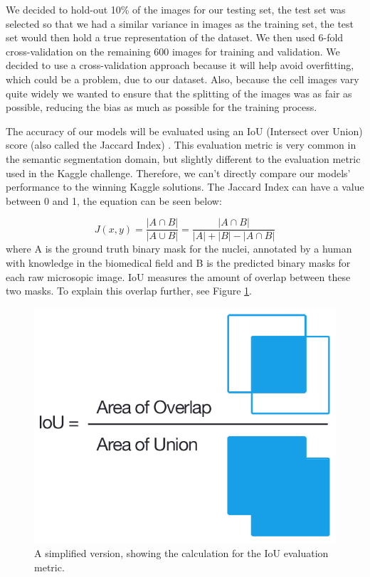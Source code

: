 \documentclass{article}
\begin{document}
We decided to hold-out 10\% of the images for our testing set, the test set was selected so that we had a similar variance in images as the training set, the test set would then hold a true representation of the dataset. We then used 6-fold cross-validation on the remaining 600 images for training and validation. We decided to use a cross-validation approach because it will help avoid overfitting, which could be a problem, due to our dataset. Also, because the cell images vary quite widely we wanted to ensure that the splitting of the images was as fair as possible, reducing the bias as much as possible for the training process.

The accuracy of our models will be evaluated using an IoU (Intersect over Union) score (also called the Jaccard Index) \cite{Tan2005IntroductionTD}. This evaluation metric is very common in the semantic segmentation domain, but slightly different to the evaluation metric used in the Kaggle challenge. Therefore, we can't directly compare our models' performance to the winning Kaggle solutions. The Jaccard Index can have a value between 0 and 1, the equation can be seen below:


\[ J(x,y) = \dfrac{|A \cap B|}{|A \cup B|} = \dfrac{|A \cap B|}{|A|+|B|-|A \cap B|}\]
where A is the ground truth binary mask for the nuclei, annotated by a human with knowledge in the biomedical field and B is the  predicted binary masks for each raw microsopic image. IoU measures the amount of overlap between these two masks. To explain this overlap further, see Figure \ref{fig:iou}.

\begin{figure}[ht]
\vskip 5mm
\begin{center}
\centerline{\includegraphics[scale=0.19]{mlp-cw3-template/Figures/iou.png}}
\caption{A simplified version, showing the calculation for the IoU evaluation metric.}
\label{fig:iou}
\end{center}
\vskip -5mm
\end{figure} 
\end{document}
